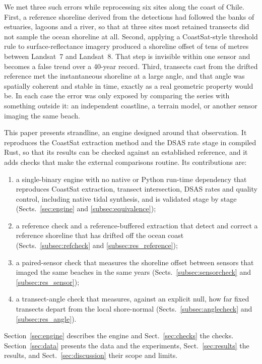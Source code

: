 \documentclass[authoryear,preprint,review,12pt]{elsarticle}
\begin{document}
We met three such errors while reprocessing six sites along the coast of
Chile. First, a reference shoreline derived from the detections had followed
the banks of estuaries, lagoons and a river, so that at three sites most
retained transects did not sample the ocean shoreline at all. Second, applying
a CoastSat-style threshold rule to surface-reflectance imagery produced a
shoreline offset of tens of metres between Landsat~7 and Landsat~8. That step
is invisible within one sensor and becomes a false trend over a 40-year record.
Third, transects cast from the drifted reference met the instantaneous
shoreline at a large angle, and that angle was spatially coherent and stable in
time, exactly as a real geometric property would be. In each case the error was
only exposed by comparing the series with something outside it: an independent
coastline, a terrain model, or another sensor imaging the same beach.

This paper presents strandline, an engine designed around that observation. It
reproduces the CoastSat extraction method and the DSAS rate stage in compiled
Rust, so that its results can be checked against an established reference, and
it adds checks that make the external comparisons routine. Its contributions
are:

\begin{enumerate}
  \item a single-binary engine with no native or Python run-time dependency
  that reproduces CoastSat extraction, transect intersection, DSAS rates and
  quality control, including native tidal synthesis, and is validated stage by
  stage (Sects.~\ref{sec:engine} and \ref{subsec:equivalence});
  \item a reference check and a reference-buffered extraction that detect and
  correct a reference shoreline that has drifted off the ocean coast
  (Sects.~\ref{subsec:refcheck} and \ref{subsec:res_reference});
  \item a paired-sensor check that measures the shoreline offset between
  sensors that imaged the same beaches in the same years
  (Sects.~\ref{subsec:sensorcheck} and \ref{subsec:res_sensor});
  \item a transect-angle check that measures, against an explicit null, how far
  fixed transects depart from the local shore-normal
  (Sects.~\ref{subsec:anglecheck} and \ref{subsec:res_angle}).
\end{enumerate}

\noindent Section~\ref{sec:engine} describes the engine and
Sect.~\ref{sec:checks} the checks. Section~\ref{sec:data} presents the data and
the experiments, Sect.~\ref{sec:results} the results, and
Sect.~\ref{sec:discussion} their scope and limits.
\end{document}
